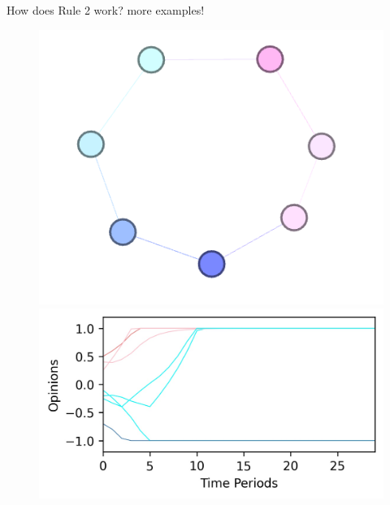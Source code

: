 \documentclass[xcolor=table,handout]{beamer}
\begin{document}
\begin{frame}{How does Rule 2 work? more examples! }
%
\begin{figure}
\centering
\begin{minipage}{.5\textwidth}
  \centering
  \includegraphics[scale = 0.55]{./img/ideo_non_monotonic.png}
\end{minipage}%
\begin{minipage}{.5\textwidth}
  \centering
  \includegraphics[scale = 0.55]{./img/plot_ideo_opposed_non_monotonic.jpg}
\end{minipage}
\end{figure}
\end{frame}
%
\end{document}
